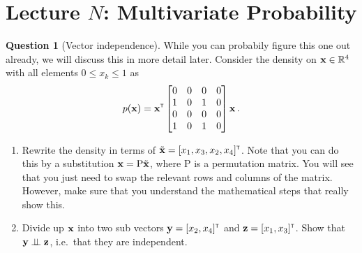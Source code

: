 \documentclass[a4paper]{article}
\newcommand{\mat}[1]{{\mathrm{{#1}}}} %
\theoremstyle{definition}
\newtheorem{question}{Question}
\begin{document}





\section{Lecture $N$: Multivariate Probability}
\begin{question}[Vector independence] {\color{red}While you can probabily figure this one out already, we will discuss this in more detail later.}
Consider the density on $\mathbf{x} \in \mathbb{R}^4$ with all elements $0 \leq x_k \leq 1$ as
\begin{align}
p(\mathbf{x}) = \mathbf{x}^\mathrm{\textsf{\tiny T}} \begin{bmatrix} 0 & 0 & 0 & 0 \\ 1 & 0 & 1 & 0 \\ 0 & 0 & 0 & 0 \\ 1 & 0 & 1 & 0\end{bmatrix} \mathbf{x} \,.
\end{align}
\begin{enumerate}[label=\alph*.]
\item Rewrite the density in terms of $\tilde{\mathbf{x}} = [x_1, x_3, x_2, x_4]^\mathrm{\textsf{\tiny T}}$. Note that you can do this by a substitution $\vx = \mat P \tilde\vx$, where $\mat P$ is a permutation matrix. You will see that you just need to swap the relevant rows and columns of the matrix. However, make sure that you understand the mathematical steps that really show this.
\item Divide up $\mathbf{x}$ into two sub vectors $\mathbf{y} = [x_2, x_4]^\mathrm{\textsf{\tiny T}}$ and $\mathbf{z} = [x_1, x_3]^\mathrm{\textsf{\tiny T}}$. Show that $\mathbf{y} \perp\!\!\!\perp \mathbf{z}$, i.e.~that they are independent.
\end{enumerate}
\end{question}
























\printbibliography
\end{document}
